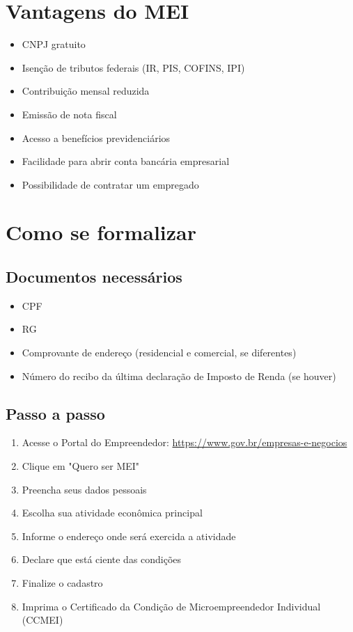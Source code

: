 \documentclass[12pt,a4paper]{article}
\begin{document}
\section{Vantagens do MEI}

\begin{itemize}
    \item CNPJ gratuito
    \item Isenção de tributos federais (IR, PIS, COFINS, IPI)
    \item Contribuição mensal reduzida
    \item Emissão de nota fiscal
    \item Acesso a benefícios previdenciários
    \item Facilidade para abrir conta bancária empresarial
    \item Possibilidade de contratar um empregado
\end{itemize}

\section{Como se formalizar}

\subsection{Documentos necessários}
\begin{itemize}
    \item CPF
    \item RG
    \item Comprovante de endereço (residencial e comercial, se diferentes)
    \item Número do recibo da última declaração de Imposto de Renda (se houver)
\end{itemize}

\subsection{Passo a passo}
\begin{enumerate}
    \item Acesse o Portal do Empreendedor: \url{https://www.gov.br/empresas-e-negocios}
    \item Clique em "Quero ser MEI"
    \item Preencha seus dados pessoais
    \item Escolha sua atividade econômica principal
    \item Informe o endereço onde será exercida a atividade
    \item Declare que está ciente das condições
    \item Finalize o cadastro
    \item Imprima o Certificado da Condição de Microempreendedor Individual (CCMEI)
\end{enumerate}
\end{document}
